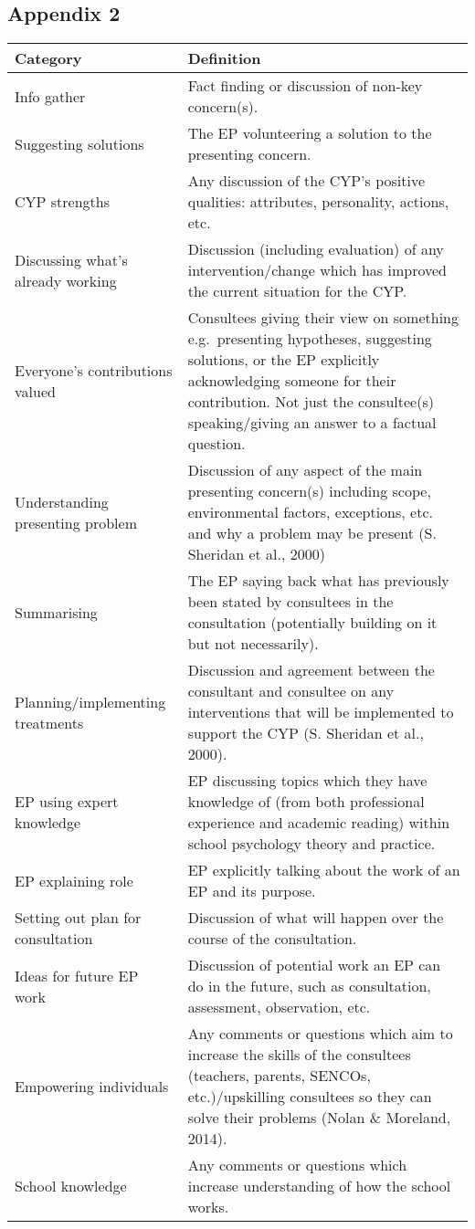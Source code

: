\documentclass[
  english,
  man]{apa}
\begin{document}
\hypertarget{appendix-2}{%
\subsection{Appendix 2}\label{appendix-2}}

\begin{longtable}[]{@{}
  >{\raggedright\arraybackslash}p{}
  >{\raggedright\arraybackslash}p{}@{}}
\toprule
Category & Definition \\
\midrule
\endhead
Info gather & Fact finding or discussion of
non-key concern(s). \\
Suggesting solutions & The EP volunteering a solution to
the presenting concern. \\
CYP strengths & Any discussion of the CYP's
positive qualities: attributes,
personality, actions, etc. \\
Discussing what's already
working & Discussion (including evaluation)
of any intervention/change which
has improved the current situation
for the CYP. \\
Everyone's contributions valued & Consultees giving their view on
something e.g.~presenting
hypotheses, suggesting solutions,
or the EP explicitly acknowledging
someone for their contribution.
Not just the consultee(s)
speaking/giving an answer to a
factual question. \\
Understanding presenting
problem & Discussion of any aspect of the
main presenting concern(s)
including scope, environmental
factors, exceptions, etc. and why
a problem may be present
(S. Sheridan et al., 2000) \\
Summarising & The EP saying back what has
previously been stated by
consultees in the consultation
(potentially building on it but
not necessarily). \\
Planning/implementing
treatments & Discussion and agreement between
the consultant and consultee on
any interventions that will be
implemented to support the CYP
(S. Sheridan et al., 2000). \\
EP using expert knowledge & EP discussing topics which they
have knowledge of (from both
professional experience and
academic reading) within school
psychology theory and practice. \\
EP explaining role & EP explicitly talking about the
work of an EP and its purpose. \\
Setting out plan for
consultation & Discussion of what will happen
over the course of the
consultation. \\
Ideas for future EP work & Discussion of potential work an EP
can do in the future, such as
consultation, assessment,
observation, etc. \\
Empowering individuals & Any comments or questions which
aim to increase the skills of the
consultees (teachers, parents,
SENCOs, etc.)/upskilling
consultees so they can solve their
problems
(Nolan \& Moreland, 2014). \\
School knowledge & Any comments or questions which
increase understanding of how the
school works. \\
\bottomrule
\end{longtable}
\end{document}
